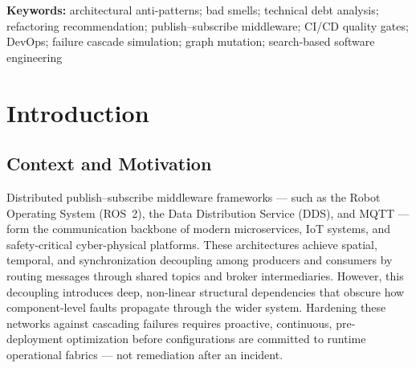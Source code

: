 \documentclass[11pt]{article}
\begin{document}
\begin{abstract}
Across eight benchmark scenarios used for detection validation and a seven-scenario subset used for
prescriptive evaluation --- spanning autonomous vehicles, IoT, finance, healthcare, and hyper-scale
enterprise topologies --- the generated prescriptions reduce the System Risk Index (SRI, lower is
better) in every scenario, with relative risk reductions between 1.4\% and 15.9\% (Wilcoxon
signed-rank across the seven baseline/mutated pairs: $W=0.0$, $p=0.0156$, significant at
$\alpha=0.05$). We report this result alongside a less flattering but more honest one: component-level
failure-impact reductions average only $+4.61\%$ and regress in two of seven scenarios ($-31.67\%$ and
$-25.36\%$), because the current prescriptive policy is applied greedily and unconditionally,
occasionally introducing new cascade hops that offset its own gains --- a finding that directly
motivates a per-edit acceptance filter as the highest-priority extension. The full generate--verify
loop completes in under 65 seconds for six of the seven prescription scenarios (4.7\,s--64.3\,s) and
in approximately 10.8 minutes for the 300-process enterprise topology, while the standalone CI/CD
detection gate completes in under 2 seconds to $\sim$40 seconds across the same scale range --- making
both proactive anti-pattern detection and closed-loop prescriptive refactoring practical as
merge-request-gated or nightly pre-deployment CI/CD stages.
\end{abstract}

\noindent\textbf{Keywords:} architectural anti-patterns; bad smells; technical debt analysis;
refactoring recommendation; publish--subscribe middleware; CI/CD quality gates; DevOps; failure
cascade simulation; graph mutation; search-based software engineering

\section{Introduction}

\subsection{Context and Motivation}

Distributed publish--subscribe middleware frameworks --- such as the Robot Operating System (ROS~2),
the Data Distribution Service (DDS), and MQTT --- form the communication backbone of modern
microservices, IoT systems, and safety-critical cyber-physical platforms. These architectures achieve
spatial, temporal, and synchronization decoupling among producers and consumers by routing messages
through shared topics and broker intermediaries. However, this decoupling introduces deep, non-linear
structural dependencies that obscure how component-level faults propagate through the wider system.
Hardening these networks against cascading failures requires proactive, continuous, pre-deployment
optimization before configurations are committed to runtime operational fabrics --- not remediation
after an incident.
\end{document}
